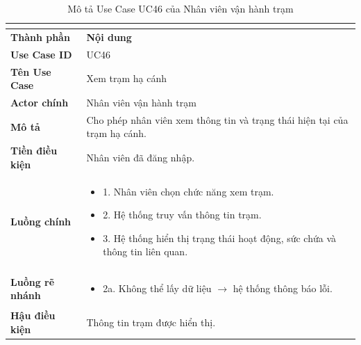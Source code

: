 \begin{longtable}{|C{3cm}|L{11cm}|}
\caption{Mô tả Use Case UC46 của Nhân viên vận hành trạm}\\
\label{tab:mo-ta-uc46-van-hanh-tram}\\
\hline
\textbf{Thành phần} & \textbf{Nội dung} \\
\hline
\textbf{Use Case ID} & UC46 \\
\hline
\textbf{Tên Use Case} & Xem trạm hạ cánh \\
\hline
\textbf{Actor chính} & Nhân viên vận hành trạm \\
\hline
\textbf{Mô tả} &
Cho phép nhân viên xem thông tin và trạng thái hiện tại của trạm hạ cánh.
\\
\hline
\textbf{Tiền điều kiện} &
Nhân viên đã đăng nhập.
\\
\hline
\textbf{Luồng chính} &
\begin{itemize}[leftmargin=*,topsep=2pt,itemsep=2pt]
    \item 1. Nhân viên chọn chức năng xem trạm.
    \item 2. Hệ thống truy vấn thông tin trạm.
    \item 3. Hệ thống hiển thị trạng thái hoạt động, sức chứa và thông tin liên quan.
\end{itemize}
\\
\hline
\textbf{Luồng rẽ nhánh} &
\begin{itemize}[leftmargin=*,topsep=2pt,itemsep=2pt]
    \item 2a. Không thể lấy dữ liệu $\rightarrow$ hệ thống thông báo lỗi.
\end{itemize}
\\
\hline
\textbf{Hậu điều kiện} &
Thông tin trạm được hiển thị.
\\
\hline
\end{longtable}


